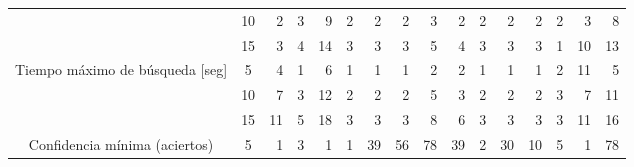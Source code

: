 \begin{sidewaystable}
\begin{tabular}{@{}ccc|rrrrrrrrrrrrrr@{}}
\multicolumn{2}{c}{}                                               & 10 & 2                      & 3                      & 9                      & 2                      & 2                      & 2                      & 3                      & 2                      & 2                      & 2                      & 2                      & 2                      & 3                      & 8                      \\
\multicolumn{2}{c}{}                                               & 15 & 3                      & 4                      & 14                     & 3                      & 3                      & 3                      & 5                      & 4                      & 3                      & 3                      & 3                      & 1                      & 10                     & 13                     \\
\midrule
\multicolumn{2}{c}{\multirow{3}{*}{Tiempo máximo de búsqueda {[}seg{]}}}     & 5  & 4                      & 1                      & 6                      & 1                      & 1                      & 1                      & 2                      & 2                      & 1                      & 1                      & 1                      & 2                      & 11                     & 5                      \\
\multicolumn{2}{c}{}                                               & 10 & 7                      & 3                      & 12                     & 2                      & 2                      & 2                      & 5                      & 3                      & 2                      & 2                      & 2                      & 3                      & 7                      & 11                     \\
\multicolumn{2}{c}{}                                               & 15 & 11                     & 5                      & 18                     & 3                      & 3                      & 3                      & 8                      & 6                      & 3                      & 3                      & 3                      & 3                      & 11                     & 16                     \\
\midrule
\multicolumn{2}{c}{\multirow{3}{*}{Confidencia mínima (aciertos)}} & 5  & 1                      & 3                      & 1                      & 1                      & 39                     & 56                     & 78                     & 39                     & 2                      & 30                     & 10                     & 5                      & 1                      & 78                     \\

\end{tabular}
\end{sidewaystable}
